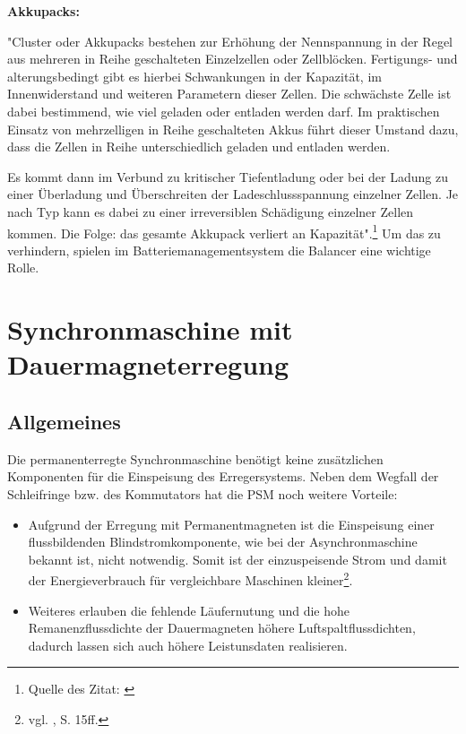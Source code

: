 \textbf{Akkupacks:}

"Cluster oder Akkupacks bestehen zur Erhöhung der Nennspannung in der Regel aus mehreren in Reihe geschalteten Einzelzellen oder Zellblöcken. Fertigungs- und alterungsbedingt gibt es hierbei Schwankungen in der Kapazität, im Innenwiderstand und weiteren Parametern dieser Zellen. Die schwächste Zelle ist dabei bestimmend, wie viel geladen oder entladen werden darf. Im praktischen Einsatz von mehrzelligen in Reihe geschalteten Akkus führt dieser Umstand dazu, dass die Zellen in Reihe unterschiedlich geladen und entladen werden.

Es kommt dann im Verbund zu kritischer Tiefentladung oder bei der Ladung zu einer Überladung und Überschreiten der Ladeschlussspannung einzelner Zellen. Je nach Typ kann es dabei zu einer irreversiblen Schädigung einzelner Zellen kommen. Die Folge: das gesamte Akkupack verliert an Kapazität".\footnote{Quelle des Zitat: \cite{BalancingderPacks}}
Um das zu verhindern, spielen im Batteriemanagementsystem die Balancer eine wichtige Rolle.

\newpage


\section{Synchronmaschine mit Dauermagneterregung}
\subsection{Allgemeines}
Die permanenterregte Synchronmaschine benötigt keine zusätzlichen Komponenten für die Einspeisung des Erregersystems. Neben dem Wegfall der Schleifringe bzw. des Kommutators hat die PSM noch weitere Vorteile:
\\[5mm]
\begin{itemize}
	\item Aufgrund der Erregung mit Permanentmagneten ist die Einspeisung einer flussbildenden Blindstromkomponente, wie bei der Asynchronmaschine bekannt ist, nicht notwendig. Somit ist der einzuspeisende Strom und damit der Energieverbrauch für vergleichbare Maschinen kleiner\footnote{vgl. \cite{Dissertation}, S. 15ff.}. \\[3mm]
	\item Weiteres erlauben die fehlende Läufernutung und die hohe Remanenzflussdichte der Dauermagneten höhere Luftspaltflussdichten, dadurch lassen sich auch höhere Leistunsdaten realisieren. \\[3mm]
\end{itemize}

